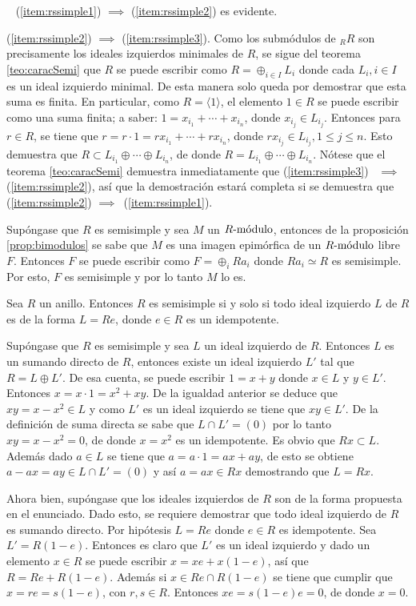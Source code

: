 \begin{proof*}~\newline
\indent (\ref{item:rssimple1}) $\implies$ (\ref{item:rssimple2}) es evidente.

(\ref{item:rssimple2}) $\implies$ (\ref{item:rssimple3}). Como los submódulos de $_RR$ son precisamente los ideales izquierdos minimales de $R$, se sigue del teorema \ref{teo:caracSemi} que $R$ se puede escribir como $R = \oplus_{i \in I}L_i$ donde cada $L_i, i \in I$ es un ideal izquierdo minimal. De esta manera solo queda por demostrar que esta suma es finita.
En particular, como $R = \langle 1 \rangle$, el elemento $1 \in R$ se puede escribir como una suma finita; a saber: $1 = x_{i_1} + \cdots + x_{i_n}$, donde $x_{i_j} \in L_{i_j}$. Entonces para $r \in R$, se tiene que $r = r \cdot 1 = rx_{i_1} + \cdots +rx_{i_n}$, donde $rx_{i_j} \in L_{i_j}, 1\leq j \leq n$. Esto demuestra que $R \subset L_{i_1} \oplus \cdots \oplus L_{i_n}$, de donde $R = L_{i_1} \oplus \cdots \oplus L_{i_n}$.
Nótese que el teorema \ref{teo:caracSemi} demuestra inmediatamente que (\ref{item:rssimple3})~ $\implies$(\ref{item:rssimple2}), así que la demostración estará completa si se demuestra que (\ref{item:rssimple2}) $\implies$~(\ref{item:rssimple1}). 

Supóngase que $R$ es semisimple y sea $M$ un $\modulo{R}$, entonces de la proposición \ref{prop:bimodulos} se sabe que $M$ es una imagen epimórfica de un $\modulo{R}$ libre $F$. Entonces $F$ se puede escribir como $F = \oplus_{i}Ra_i$ donde $Ra_i \simeq R$ es semisimple. Por esto, $F$ es semisimple y por lo tanto $M$ lo es. 
\end{proof*}
\begin{teorema}\label{teo:idealIdem}
Sea $R$ un anillo. Entonces $R$ es semisimple si y solo si todo ideal izquierdo $L$ de $R$ es de la forma $L = Re$, donde $e \in R$ es un idempotente.
\end{teorema}
\begin{proof*}
Supóngase que $R$ es semisimple y sea $L$ un ideal  izquierdo de $R$. Entonces $L$ es un sumando directo de $R$, entonces existe un ideal izquierdo $L'$ tal que $R = L \oplus L'$. De esa cuenta, se puede escribir $1 = x + y$ donde $x \in L$ y $y \in L'$. Entonces $x = x \cdot 1 = x^2 + xy$. De la igualdad anterior se deduce que $xy = x - x^2 \in L$ y como $L'$ es un ideal izquierdo se tiene que $xy \in L'$. De la definición de suma directa se sabe que $L \cap L' = (0)$ por lo tanto $xy = x - x^2 = 0$, de donde $x = x^2$ es un idempotente. Es obvio que $Rx \subset L$. Además dado $a  \in L$ se tiene que $a = a \cdot 1 = ax + ay$, de esto se obtiene $a -ax = ay\in L\cap L'=(0)$ y así $a = ax \in Rx$ demostrando que $L = Rx$. 

Ahora bien, supóngase que los ideales izquierdos de $R$ son de la forma propuesta en el enunciado. Dado esto, se requiere demostrar que todo ideal izquierdo de $R$ es sumando directo. Por hipótesis $L = Re$ donde $e \in R$ es idempotente. Sea $L'= R(1-e)$. Entonces es claro que $L'$ es un ideal izquierdo y dado un elemento $x \in R$ se puede escribir $x = xe + x(1-e)$, así que $R = Re + R(1-e)$. Además si $x \in Re \cap R(1-e)$ se tiene que cumplir que $x = re = s(1-e)$, con $r,s \in R$. Entonces $xe = s(1-e)e = 0$, de donde $x = 0$.  
\end{proof*}

